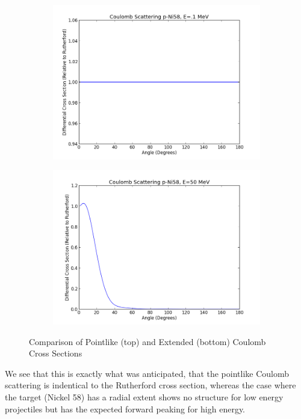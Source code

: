 \documentclass[paper=a4, fontsize=11pt]{scrartcl} %
\numberwithin{equation}{section} %
\numberwithin{figure}{section} %
\numberwithin{table}{section} %
\begin{document}
\begin{figure}[hbt]
        \begin{subfigure}[b]{0.35\textwidth}
                \includegraphics[width=\textwidth]{Coulombpoint1.png}
        \end{subfigure}
\quad
        \begin{subfigure}[b]{0.35\textwidth}
                \includegraphics[width=\textwidth]{Coulomb50.png}
        \end{subfigure}

        \caption{Comparison of Pointlike (top) and Extended (bottom) Coulomb Cross Sections }
\end{figure}

We see that this is exactly what was anticipated, that the pointlike Coulomb scattering is indentical to the Rutherford cross section, whereas the case where the target (Nickel 58) has a radial extent shows no structure for low energy projectiles but has the expected forward peaking for high energy. \\
\end{document}
